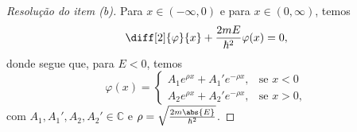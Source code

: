 \begin{proof}[Resolução do item (b)]
    Para \(x \in (-\infty, 0)\) e para \(x \in (0, \infty)\), temos
    \begin{equation*}
        \diff[2]{\varphi}{x} + \frac{2m E}{\hbar^2}\varphi(x) = 0,
    \end{equation*}
    donde segue que, para \(E < 0\), temos
    \begin{equation*}
        \varphi(x) = \begin{cases}
            \displaystyle A_1 e^{\rho x} + A_1' e^{-\rho x},&\text{se }x < 0\\
            \displaystyle A_2 e^{\rho x} + A_2' e^{-\rho x},&\text{se }x > 0,
        \end{cases}
    \end{equation*}
    com \(A_1, A_1', A_2, A_2' \in \mathbb{C}\) e \(\rho = \sqrt{\frac{2m\abs{E}}{\hbar^2}}\).


\end{proof}
